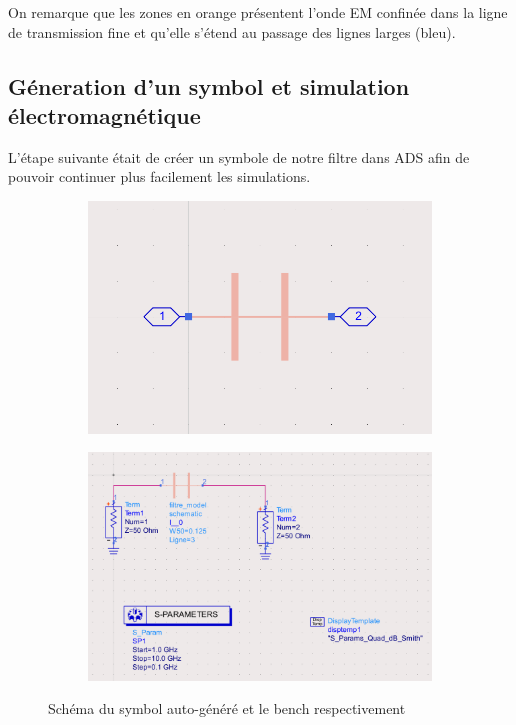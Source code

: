\documentclass[a4paper]{article}
\begin{document}
On remarque que les zones en orange pr\'esentent l'onde EM confin\'ee dans la ligne de transmission fine et qu'elle s'\'etend au
passage des lignes larges (bleu).

\subsection{G\'eneration d'un symbol et simulation \'electromagn\'etique}

L'\'etape suivante \'etait de cr\'eer un symbole de notre filtre dans ADS afin de pouvoir continuer plus facilement les simulations.

\begin{figure}[!htb]
  \begin{subfigure}[t]{.5\linewidth}
      \centering
      \includegraphics[width=0.99\linewidth]{auto_generated_schematic_copper.png}
      \label{fig:auto_generated_schematic_copper}
  \end{subfigure}%
  \begin{subfigure}[t]{.5\linewidth}
    \centering
    \includegraphics[width=1\linewidth]{filtre_symbol.png}
    \label{fig:filtre_symbol}
  \end{subfigure}%
  \caption{Sch\'ema du symbol auto-g\'en\'er\'e et le bench respectivement}
  \label{fig:filtre_symbol_bench}
\end{figure}
\end{document}
